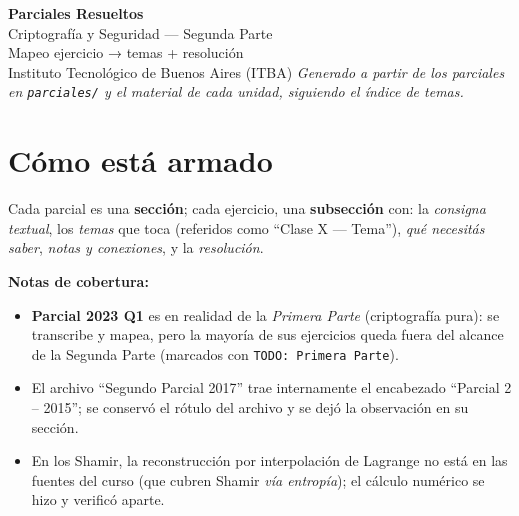 \documentclass[11pt,a4paper]{article}
\begin{document}

\begin{titlepage}
\centering
\vspace*{2cm}
{\Huge\bfseries\color{itbaCyanDark} Parciales Resueltos}\\[0.4cm]
{\LARGE Criptografía y Seguridad — Segunda Parte}\\[0.3cm]
{\large Mapeo ejercicio → temas + resolución}\\[1.2cm]
{\normalsize Instituto Tecnológico de Buenos Aires (ITBA)}
\vfill
{\footnotesize\itshape Generado a partir de los parciales en \texttt{parciales/} y el material de
cada unidad, siguiendo el índice de temas.}
\end{titlepage}

\tableofcontents
\newpage

\section*{Cómo está armado}
Cada parcial es una \textbf{sección}; cada ejercicio, una \textbf{subsección} con: la
\emph{consigna textual}, los \emph{temas} que toca (referidos como ``Clase X — Tema''), \emph{qué
necesitás saber}, \emph{notas y conexiones}, y la \emph{resolución}.

\medskip
\noindent\textbf{Notas de cobertura:}
\begin{itemize}[leftmargin=1.4em,itemsep=2pt]
  \item \textbf{Parcial 2023 Q1} es en realidad de la \emph{Primera Parte} (criptografía pura):
        se transcribe y mapea, pero la mayoría de sus ejercicios queda fuera del alcance de la
        Segunda Parte (marcados con \texttt{TODO: Primera Parte}).
  \item El archivo ``Segundo Parcial 2017'' trae internamente el encabezado ``Parcial 2 -- 2015'';
        se conservó el rótulo del archivo y se dejó la observación en su sección.
  \item En los Shamir, la reconstrucción por interpolación de Lagrange no está en las fuentes del
        curso (que cubren Shamir \emph{vía entropía}); el cálculo numérico se hizo y verificó aparte.
\end{itemize}

\end{document}
